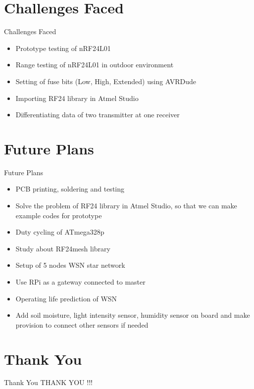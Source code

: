 \documentclass[10pt, a4paper]{beamer}
\begin{document}
\section{Challenges Faced}
\begin{frame}{Challenges Faced}
	\begin{itemize}
		\item Prototype testing of nRF24L01
        \item Range testing of nRF24L01 in outdoor environment
        \item Setting of fuse bits (Low, High, Extended) using AVRDude
        \item Importing RF24 library in Atmel Studio
        \item Differentiating data of two transmitter at one receiver
	\end{itemize} 
\end{frame}

\section{Future Plans}
\begin{frame}{Future Plans}
	\begin{itemize}
		\item PCB printing, soldering and testing
        \item Solve the problem of RF24 library in Atmel Studio, so that we can make example codes for prototype
        \item Duty cycling of ATmega328p
        \item Study about RF24mesh library
        \item Setup of 5 nodes WSN star network
        \item Use RPi as a gateway connected to master
        \item Operating life prediction of WSN
        \item Add soil moisture, light intensity sensor, humidity sensor on board and make provision to connect other sensors if needed
	\end{itemize}
\end{frame}


\section{Thank You}
\begin{frame}{Thank You}
	\centering THANK YOU !!!
\end{frame}
\end{document}
